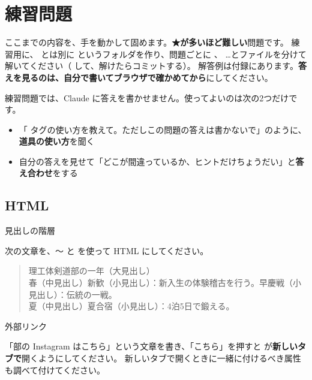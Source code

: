 \section{練習問題}

ここまでの内容を、手を動かして固めます。\textbf{★が多いほど難しい}問題です。
練習用に、 とは別に  というフォルダを作り、問題ごとに 、 \ldots とファイルを分けて解いてください（ して、解けたらコミットする）。
解答例は付録にあります。\textbf{答えを見るのは、自分で書いてブラウザで確かめてから}にしてください。

\begin{tip}
練習問題では、Claude に答えを書かせません。使ってよいのは次の2つだけです。
\begin{itemize}
  \item 「 タグの使い方を教えて。ただしこの問題の答えは書かないで」のように、\textbf{道具の使い方}を聞く
  \item 自分の答えを見せて「どこが間違っているか、ヒントだけちょうだい」と\textbf{答え合わせ}をする
\end{itemize}
\end{tip}

\subsection*{HTML}

\begin{exercise}[1]{見出しの階層}
\toanswer\par
次の文章を、〜 と  を使って HTML にしてください。
\begin{quote}\small
理工体剣道部の一年（大見出し）\\
春（中見出し）\quad 新歓（小見出し）：新入生の体験稽古を行う。\quad 早慶戦（小見出し）：伝統の一戦。\\
夏（中見出し）\quad 夏合宿（小見出し）：4泊5日で鍛える。
\end{quote}
\end{exercise}

\begin{exercise}[1]{外部リンク}
\toanswer\par
「部の Instagram はこちら」という文章を書き、「こちら」を押すと  が\textbf{新しいタブで}開くようにしてください。
新しいタブで開くときに一緒に付けるべき属性も調べて付けてください。
\end{exercise}

